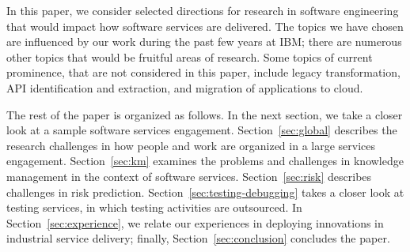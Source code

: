

In this paper, we consider selected directions for research in software
engineering that would impact how software services are delivered.  The topics
we have chosen are influenced by our work during the past few years at IBM;
there are numerous other topics that would be fruitful areas of research.  Some
topics of current prominence, that are not considered in this paper, include
legacy transformation, API identification and extraction, and migration of
applications to cloud.


The rest of the paper is organized as follows. In the next section, we take a
closer look at a sample software services engagement.  Section~\ref{sec:global}
describes the research challenges in how people and work are organized in a
large services engagement.  Section~\ref{sec:km} examines the problems and
challenges in knowledge management in the context of software services.
Section~\ref{sec:risk} describes challenges in risk prediction.
Section~\ref{sec:testing-debugging} takes a closer look at testing services, in
which testing activities are outsourced.  In Section~\ref{sec:experience}, we
relate our experiences in deploying innovations in industrial service delivery;
finally, Section~\ref{sec:conclusion} concludes the paper.

